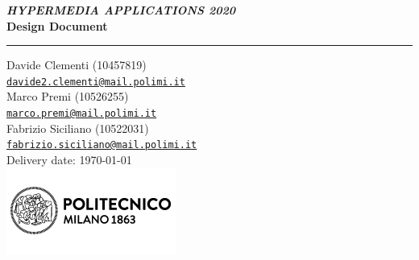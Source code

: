 \begin{titlepage}
	\begin{flushleft}
		\textit{\textbf{HYPERMEDIA APPLICATIONS 2020}}\\
		\vspace{0.8cm}
		{\Huge \bfseries \sffamily Design Document}
		\vspace{0.8cm}
		\rule{\textwidth}{0.1cm} 
		\vspace{0.8cm}
	\end{flushleft} 
	\begin{center}
		Davide Clementi (10457819)\\[0cm]
		{\small \href{mailto:davide2.clementi@mail.polimi.it}{\texttt{davide2.clementi@mail.polimi.it}}}
		\\[0.5cm]
		Marco Premi (10526255)\\[0cm]
		{\small \href{mailto:marco.premi@mail.polimi.it}{\texttt{marco.premi@mail.polimi.it}}}
		\\[0.5cm]
		Fabrizio Siciliano (10522031)\\[0cm]
		{\small \href{mailto:fabrizio.siciliano@mail.polimi.it}{\texttt{fabrizio.siciliano@mail.polimi.it}}}\\
		\vspace{1.5cm} 
		Delivery date: \today\\[5ex] 
		\vspace{1cm}
		\vspace{1cm}
		\includegraphics{resources/images/logo_polimi.png}
	\end{center} 
\end{titlepage} 
\setcounter{page}{1} %